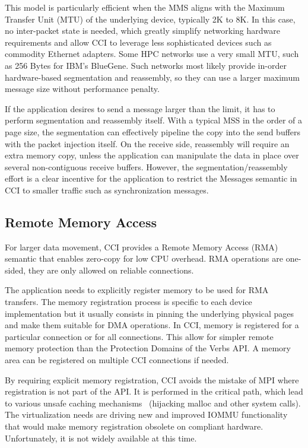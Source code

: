 This model is particularly efficient when the MMS aligns with the Maximum 
Transfer Unit (MTU) of the underlying device, typically 2K to 8K. 
In this case, no inter-packet state is needed, which greatly simplify 
networking hardware requirements and allow CCI to leverage less 
sophisticated devices such as commodity Ethernet adapters. 
Some HPC networks use a very small MTU, such as 256 Bytes for 
IBM's BlueGene. Such networks most likely 
provide in-order hardware-based segmentation and reassembly, so they 
can use a larger maximum message size without performance penalty.

If the application desires to send a message larger than the limit, it has 
to perform segmentation and reassembly itself. With a typical MSS in the order 
of a page size, the segmentation can effectively pipeline the copy into the 
send buffers with the packet injection itself. On the receive side, 
reassembly will require an extra memory copy, unless the application can 
manipulate the data in place over several non-contiguous receive buffers.
However, the segmentation/reassembly effort is a clear incentive for the 
application to restrict the Messages semantic in CCI to smaller traffic 
such as synchronization messages.

\subsection{Remote Memory Access}
For larger data movement, CCI provides a Remote Memory Access (RMA) semantic 
that enables zero-copy for low CPU overhead. RMA operations are one-sided, 
they are only allowed on reliable connections. 

The application needs to explicitly register memory to be used for RMA 
transfers. The memory registration process is specific to each device 
implementation but it usually consists in pinning the underlying physical 
pages and make them suitable for DMA operations. In CCI, memory is registered 
for a particular connection or for all connections. This allow for simpler 
remote memory protection than the Protection Domains of the Verbs API. A 
memory area can be registered on multiple CCI connections if needed.

By requiring explicit memory registration, CCI avoids the mistake of MPI 
where registration is not part of the API. It is performed in the critical 
path, which lead to various unsafe caching mechanisms~\cite{regcache} 
(hijacking malloc and other system calls). 
The virtualization needs are driving new and improved IOMMU functionality 
that would make memory registration obsolete on compliant hardware. 
Unfortunately, it is not widely available at this time.

